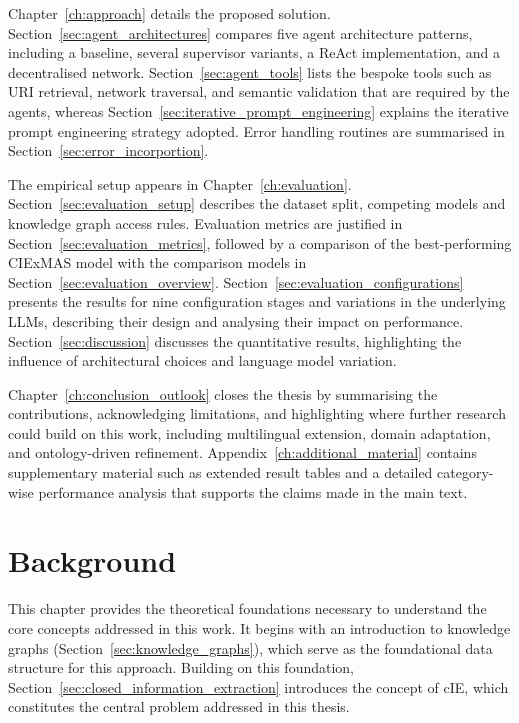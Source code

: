 \documentclass[a4paper,oneside,bibliography=totoc]{scrbook}
\begin{document}
Chapter~\ref{ch:approach} details the proposed solution. Section~\ref{sec:agent_architectures} compares five agent architecture patterns, including a baseline, several supervisor variants, a ReAct implementation, and a decentralised network. Section~\ref{sec:agent_tools} lists the bespoke tools such as URI retrieval, network traversal, and semantic validation that are required by the agents, whereas Section~\ref{sec:iterative_prompt_engineering} explains the iterative prompt engineering strategy adopted. Error handling routines are summarised in Section~\ref{sec:error_incorportion}.

The empirical setup appears in Chapter~\ref{ch:evaluation}. Section~\ref{sec:evaluation_setup} describes the dataset split, competing models and knowledge graph access rules. Evaluation metrics are justified in Section~\ref{sec:evaluation_metrics}, followed by a comparison of the best-performing CIExMAS model with the comparison models in Section~\ref{sec:evaluation_overview}. Section~\ref{sec:evaluation_configurations} presents the results for nine configuration stages and variations in the underlying \acp{LLM}, describing their design and analysing their impact on performance. Section~\ref{sec:discussion} discusses the quantitative results, highlighting the influence of architectural choices and language model variation.

Chapter~\ref{ch:conclusion_outlook} closes the thesis by summarising the contributions, acknowledging limitations, and highlighting where further research could build on this work, including multilingual extension, domain adaptation, and ontology-driven refinement. Appendix~\ref{ch:additional_material} contains supplementary material such as extended result tables and a detailed category-wise performance analysis that supports the claims made in the main text.

\chapter{Background}
\label{ch:background}

This chapter provides the theoretical foundations necessary to understand the core concepts addressed in this work. It begins with an introduction to knowledge graphs (Section~\ref{sec:knowledge_graphs}), which serve as the foundational data structure for this approach. Building on this foundation, Section~\ref{sec:closed_information_extraction} introduces the concept of \ac{cIE}, which constitutes the central problem addressed in this thesis.
\end{document}
